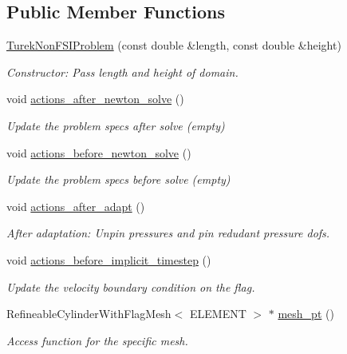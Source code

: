 \subsection*{Public Member Functions}
\begin{DoxyCompactItemize}
\item 
\hyperlink{classTurekNonFSIProblem_aacb3214544ef81c2f8b49777457e8be6}{Turek\+Non\+F\+S\+I\+Problem} (const double \&length, const double \&height)
\begin{DoxyCompactList}\small\item\em Constructor\+: Pass length and height of domain. \end{DoxyCompactList}\item 
void \hyperlink{classTurekNonFSIProblem_a161cfe46817a5129dcc33c7ce3a17173}{actions\+\_\+after\+\_\+newton\+\_\+solve} ()
\begin{DoxyCompactList}\small\item\em Update the problem specs after solve (empty) \end{DoxyCompactList}\item 
void \hyperlink{classTurekNonFSIProblem_ae5881b3424aee1ba7b947fff96493d2f}{actions\+\_\+before\+\_\+newton\+\_\+solve} ()
\begin{DoxyCompactList}\small\item\em Update the problem specs before solve (empty) \end{DoxyCompactList}\item 
void \hyperlink{classTurekNonFSIProblem_a88ed5ef8b1be34f5176c29ffec20eedd}{actions\+\_\+after\+\_\+adapt} ()
\begin{DoxyCompactList}\small\item\em After adaptation\+: Unpin pressures and pin redudant pressure dofs. \end{DoxyCompactList}\item 
void \hyperlink{classTurekNonFSIProblem_a29725cde9071c3a83792469787ea6c7d}{actions\+\_\+before\+\_\+implicit\+\_\+timestep} ()
\begin{DoxyCompactList}\small\item\em Update the velocity boundary condition on the flag. \end{DoxyCompactList}\item 
Refineable\+Cylinder\+With\+Flag\+Mesh$<$ E\+L\+E\+M\+E\+NT $>$ $\ast$ \hyperlink{classTurekNonFSIProblem_a6b9af904a3091d55a61b35c2ce7d7fcb}{mesh\+\_\+pt} ()
\begin{DoxyCompactList}\small\item\em Access function for the specific mesh. \end{DoxyCompactList}\item 

\end{DoxyCompactItemize}
